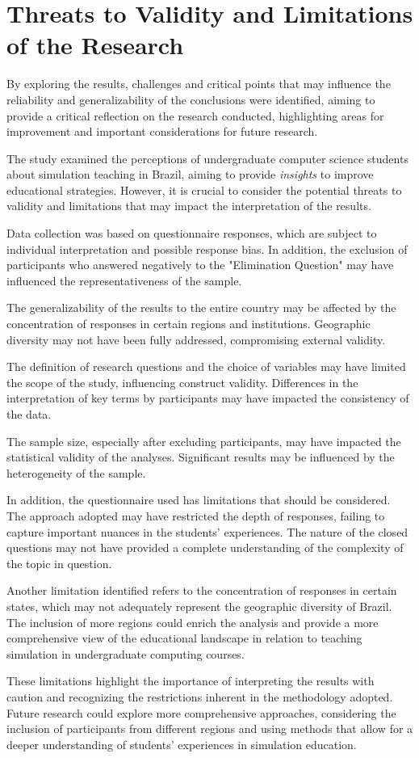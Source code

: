 \section{Threats to Validity and Limitations of the Research}
\label{sec:discussion}

By exploring the results, challenges and critical points that may influence the reliability and generalizability of the conclusions were identified, aiming to provide a critical reflection on the research conducted, highlighting areas for improvement and important considerations for future research.

The study examined the perceptions of undergraduate computer science students about simulation teaching in Brazil, aiming to provide \textit{insights} to improve educational strategies. However, it is crucial to consider the potential threats to validity and limitations that may impact the interpretation of the results.

Data collection was based on questionnaire responses, which are subject to individual interpretation and possible response bias. In addition, the exclusion of participants who answered negatively to the "Elimination Question" may have influenced the representativeness of the sample.

The generalizability of the results to the entire country may be affected by the concentration of responses in certain regions and institutions. Geographic diversity may not have been fully addressed, compromising external validity.

The definition of research questions and the choice of variables may have limited the scope of the study, influencing construct validity. Differences in the interpretation of key terms by participants may have impacted the consistency of the data.

The sample size, especially after excluding participants, may have impacted the statistical validity of the analyses. Significant results may be influenced by the heterogeneity of the sample.

In addition, the questionnaire used has limitations that should be considered. The approach adopted may have restricted the depth of responses, failing to capture important nuances in the students' experiences. The nature of the closed questions may not have provided a complete understanding of the complexity of the topic in question.

Another limitation identified refers to the concentration of responses in certain states, which may not adequately represent the geographic diversity of Brazil. The inclusion of more regions could enrich the analysis and provide a more comprehensive view of the educational landscape in relation to teaching simulation in undergraduate computing courses.

These limitations highlight the importance of interpreting the results with caution and recognizing the restrictions inherent in the methodology adopted. Future research could explore more comprehensive approaches, considering the inclusion of participants from different regions and using methods that allow for a deeper understanding of students’ experiences in simulation education.